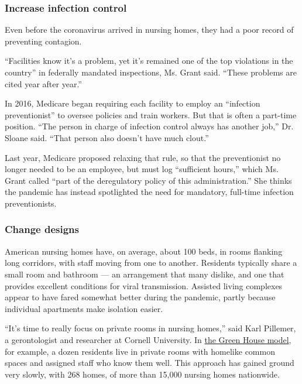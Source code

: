 \hypertarget{increase-infection-control}{%
\subsubsection{\texorpdfstring{\textbf{Increase infection
control}}{Increase infection control}}\label{increase-infection-control}}

Even before the coronavirus arrived in nursing homes, they had a poor
record of preventing contagion.

``Facilities know it's a problem, yet it's remained one of the top
violations in the country'' in federally mandated inspections, Ms. Grant
said. ``These problems are cited year after year.''

In 2016, Medicare began requiring each facility to employ an ``infection
preventionist'' to oversee policies and train workers. But that is often
a part-time position. ``The person in charge of infection control always
has another job,'' Dr. Sloane said. ``That person also doesn't have much
clout.''

Last year, Medicare proposed relaxing that rule, so that the
preventionist no longer needed to be an employee, but must log
``sufficient hours,'' which Ms. Grant called ``part of the deregulatory
policy of this administration.'' She thinks the pandemic has instead
spotlighted the need for mandatory, full-time infection preventionists.

\hypertarget{change-designs}{%
\subsubsection{\texorpdfstring{\textbf{Change
designs}}{Change designs}}\label{change-designs}}

American nursing homes have, on average, about 100 beds, in rooms
flanking long corridors, with staff moving from one to another.
Residents typically share a small room and bathroom --- an arrangement
that many dislike, and one that provides excellent conditions for viral
transmission. Assisted living complexes appear to have fared somewhat
better during the pandemic, partly because individual apartments make
isolation easier.

``It's time to really focus on private rooms in nursing homes,'' said
Karl Pillemer, a gerontologist and researcher at Cornell University. In
\href{https://www.nytimes3xbfgragh.onion/2017/12/22/health/green-houses-nursing-homes.html}{the
Green House model}, for example, a dozen residents live in private rooms
with homelike common spaces and assigned staff who know them well. This
approach has gained ground very slowly, with 268 homes, of more than
15,000 nursing homes nationwide.

